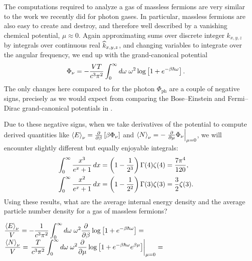 The computations required to analyze a gas of massless fermions are very similar to the work we recently did for photon gases.
In particular, massless fermions are also easy to create and destroy, and therefore well described by a vanishing chemical potential, $\mu \approx 0$.
Again approximating sums over discrete integer $k_{x, y, z}$ by integrals over continuous real $\widehat k_{x, y, z}$, and changing variables to integrate over the angular frequency, we end up with the grand-canonical potential
\begin{align}
  \Phi_{\nu} = -\frac{VT}{c^3 \pi^2} \int_0^{\infty} d\omega \; \omega^2 \log\left[1 + e^{-\beta \hbar \omega}\right]. \label{eq:neutrino_grand}
\end{align}
The only changes here compared to  for the photon $\Phi_{\text{ph}}$ are a couple of negative signs, precisely as we would expect from comparing the Bose--Einstein and Fermi--Dirac grand-canonical potentials in .

Due to these negative signs, when we take derivatives of the potential to compute derived quantities like $\left\langle E \right\rangle_{\nu} = \frac{\partial }{\partial \beta} \left[\beta \Phi_{\nu}\right]$ and $\left\langle N \right\rangle_{\nu} = -\left. \frac{\partial }{\partial \mu} \Phi_{\nu}\right|_{\mu = 0}$, we will encounter slightly different but equally enjoyable integrals: %
\begin{align*}
  \int_0^{\infty} \frac{x^3}{e^x + 1} \mathop{dx} & = \left(1 - \frac{1}{2^3}\right) \Gamma(4) \zeta(4) = \frac{7\pi^4}{120}, \\
  \int_0^{\infty} \frac{x^2}{e^x + 1} \mathop{dx} & = \left(1 - \frac{1}{2^2}\right) \Gamma(3) \zeta(3) = \frac{3}{2} \zeta(3).
\end{align*}
Using these results, what are the average internal energy density and the average particle number density for a gas of massless fermions?
\begin{mdframed}
  $\displaystyle \frac{\left\langle E \right\rangle_{\nu}}{V} = -\frac{1}{c^3 \pi^2} \int_0^{\infty} d\omega \; \omega^2 \frac{\partial }{\partial \beta} \log\left[1 + e^{-\beta \hbar \omega}\right] = $ \\[110 pt]
  $\displaystyle \frac{\left\langle N \right\rangle_{\nu}}{V} = \left. \frac{T}{c^3 \pi^2} \int_0^{\infty} d\omega \; \omega^2 \frac{\partial }{\partial \mu} \log\left[1 + e^{-\beta \hbar \omega} e^{\beta \mu}\right] \right|_{\mu = 0} = $ \\[100 pt]
\end{mdframed}

